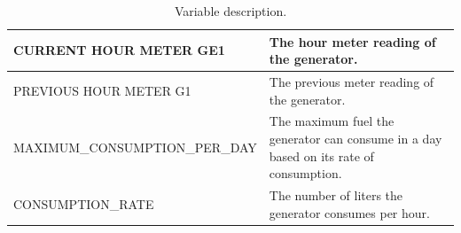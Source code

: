 \documentclass[a4paper,fleqn]{cas-dc}
\begin{document}
\begin{table}
\begin{minipage}[H]{\linewidth}
\begin{tabular}{ |p{6.3cm}|p{5cm}|}
			CURRENT HOUR METER GE1&The hour meter reading of the generator.\\
			\hline
			PREVIOUS HOUR METER G1&The previous meter reading of the generator. \\
			\hline
			MAXIMUM\_CONSUMPTION\_PER\_DAY &  The maximum fuel the generator can consume in a day based on its rate of consumption. \\
			\hline
			CONSUMPTION\_RATE 	& The number of liters the generator consumes per hour.\\
			\hline
			
			
		\end{tabular}
		
	\end{minipage}
	\captionsetup{type=table} 
	\caption{Variable description. }
	\label{Variables}
\end{table}
%
%
%
%
\end{document}
